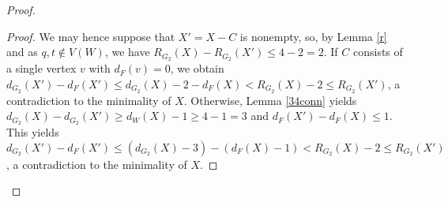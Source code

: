 \documentclass[a4paper,12pt,makeidx]{article}
\newtheorem{claim}{Claim}
\begin{document}
\begin{proof}
\begin{proof}
We may hence suppose that $X'=X-C$ is nonempty, so, by Lemma \ref{r} and as $q,t \notin V(W)$, we have $ R_{G_2}(X)- R_{G_2}(X')\leq 4-2=2$. If $C$ consists of a single vertex $v$ with $d_F(v)=0$, we obtain $d_{G_2}(X')-d_F(X')\leq d_{G_2}(X)-2-d_F(X)< R_{G_2}(X)-2\leq R_{G_2}(X')$, a contradiction to the minimality of $X$. Otherwise, Lemma \ref{34conn} yields $d_{G_2}(X)-d_{G_2}(X')\geq d_W(X)-1\geq 4-1=3$ and $d_F(X')-d_F(X)\leq 1$. This yields $d_{G_2}(X')-d_F(X')\leq (d_{G_2}(X)-3)-(d_F(X)-1)< R_{G_2}(X)-2\leq R_{G_2}(X')$, a contradiction to the minimality of $X$.




\end{proof}
\end{proof}
\end{document}
